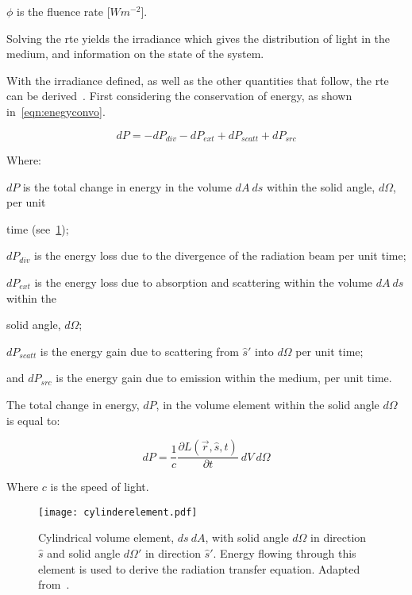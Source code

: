 \indent $\phi$ is the fluence rate [$W m^{-2}$].

\medskip

Solving the \gls*{rte} yields the irradiance which gives the distribution of light in the medium, and information on the state of the system.

With the irradiance defined, as well as the other quantities that follow, the \gls*{rte} can be derived~\cite{chandrasekhar2013radiative,wang2012biomedical}. First considering the conservation of energy, as shown in~\cref{eqn:enegyconvo}.

\begin{equation}
	dP = -dP_{div} - dP_{ext} + dP_{scatt} + dP_{src}
	\label{eqn:enegyconvo}
\end{equation}

\noindent Where:

\indent $dP$ is the total change in energy in the volume $dA\ ds$ within the solid angle, $d\Omega$, per unit 

\indent time (see~\cref{fig:energydiag2});

\indent $dP_{div}$ is the energy loss due to the divergence of the radiation beam per unit time;

\indent $dP_{ext}$ is the energy loss due to absorption and scattering within the volume $dA\ ds$ within the

\indent  solid angle, $d\Omega$;

\indent $dP_{scatt}$ is the energy gain due to scattering from $\hat{s}'$ into $d\Omega$ per unit time;

\indent and $dP_{src}$ is the energy gain due to emission within the medium, per unit time.

\medskip

The total change in energy, $dP$, in the volume element within the solid angle $d\Omega$ is equal to:

\begin{equation}
	dP=\frac{1}{c}\frac{\partial L(\vec{r},\hat{s},t)}{\partial t}\ dV\ d\Omega
	\label{eqn:p}
\end{equation}

\noindent Where $c$ is the speed of light.

\medskip

\begin{figure}[!htbp]
	\centering
	\texttt{[image: cylinderelement.pdf]}
	\caption{Cylindrical volume element, $ds\ dA$, with solid angle $d\Omega$ in direction $\hat{s}$ and solid angle $d\Omega'$ in direction $\hat{s}'$. Energy flowing through this element is used to derive the radiation transfer equation. Adapted from~\cite{wang2012biomedical,chandrasekhar2013radiative}.}
	\label{fig:energydiag2}
\end{figure}

